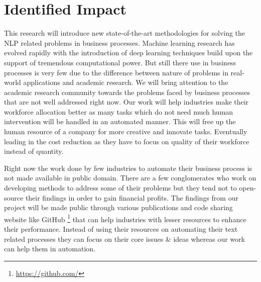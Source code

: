 \section{Identified Impact}\label{sec:impact}
This research will introduce new state-of-the-art methodologies for solving the NLP related problems in business processes. Machine learning research has evolved rapidly with the introduction of deep learning techniques build upon the support of tremendous computational power. But still there use in business processes is very few due to the difference between nature of problems in real-world applications and academic research. We will bring attention to the academic research community towards the problems faced by business processes that are not well addressed right now. Our work will help industries make their workforce allocation better as many tasks which do not need much human intervention will be handled in an automated manner. This will free up the human resource of a company for more creative and innovate tasks. Eventually leading in the cost reduction as they have to focus on quality of their workforce instead of quantity.

Right now the work done by few industries to automate their business process is not made available in public domain. There are a few conglomerates who work on developing methods to address some of their problems but they tend not to open-source their findings in order to gain financial profits. The findings from our project will be made public through various publications and code sharing website like GitHub \footnote{\url{https://github.com/}} that can help industries with lesser resources to enhance their performance. Instead of using their resources on automating their text related processes they can focus on their core issues \& ideas whereas our work can help them in automation.


